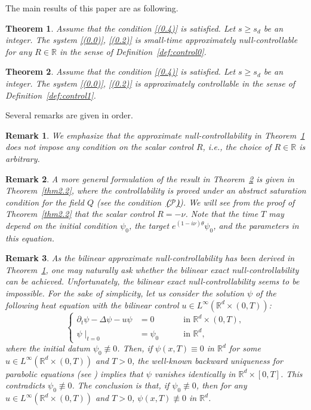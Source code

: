 \documentclass[review]{elsarticle}
\newtheorem{theorem}{Theorem}[section]
\newtheorem{remark}{Remark}[section]
\theoremstyle{dotless}
\def\R {\mathbb{R}}
\def \geq{\geqslant}
\numberwithin{equation}{section}
\begin{document}
The main results of this paper are as following.
\begin{theorem}\label{thm0}
	Assume that the condition \eqref{(0.4)} is satisfied. Let $s \geq s_d$ be an integer. The system \eqref{(0.0)}, \eqref{(0.2)} is small-time approximately null-controllable for any $R\in\R$ in the sense of Definition~\ref{def:control0}. 
\end{theorem}
\begin{theorem}\label{thma}
	Assume that the condition \eqref{(0.4)} is satisfied. Let $s \geq s_d$ be an integer. The system \eqref{(0.0)}, \eqref{(0.2)} is approximately controllable in the sense of Definition~\ref{def:control1}.
\end{theorem}
Several remarks are given in order.
\begin{remark}
	We emphasize that the approximate null-controllability in Theorem~\ref{thm0} does not impose any condition on the scalar control $R$,  i.e., the choice of $R\in\R$ is arbitrary.
\end{remark}
\begin{remark}
A more general formulation of the result in Theorem~\ref{thma} is given in Theorem~\ref{thm2.2}, where the controllability is proved under an abstract saturation condition for the field $Q$ (see the condition~{\hyperlink{H1}{\textbf{($\mathscr{P}$)}}}).
We will see from the proof of Theorem~\ref{thm2.2} that the scalar control $  R=-\nu $.
Note that the time $T$ may depend on the initial condition $\psi_0$, the target $e^{(1-i\nu) \theta} \psi_0$, and the parameters in this equation. 
\end{remark}
\begin{remark}
	As the bilinear approximate null-controllability has been derived in Theorem~\ref{thm0}, one may naturally ask whether the bilinear exact null-controllability can be achieved. Unfortunately, the bilinear exact null-controllability seems to be impossible. For the sake of simplicity, let us consider the solution $\psi$ of the following heat equation with the bilinear control $u\in L^\infty(\R^d\times(0,T))$:
	\begin{equation*}
		\left\{\begin{aligned}
			\partial_t \psi-\Delta \psi-u \psi&=0 \quad &&\text { in } \R^d \times(0, T), \\
			\psi\mid_{t=0}&=\psi_0 \quad &&\text { in } \R^d,
		\end{aligned}\right.
	\end{equation*}where the initial datum $\psi_0\not\equiv0$. Then, if $\psi(x,T)\equiv0$ in $\R^d$ for some $u\in L^\infty(\R^d\times(0,T))$ and $T>0$, the well-known backward uniqueness for parabolic equations (see \cite{LuisCPAM2003}) implies that $\psi$ vanishes identically in $\R^d\times[0,T]$. This contradicts $\psi_0\not\equiv0$. The conclusion is that, if $\psi_0\not\equiv0$, then for any $u\in L^\infty(\R^d\times(0,T))$ and $T>0$, $\psi(x,T)\not\equiv0$ in $\R^d$.
\end{remark}
\end{document}
